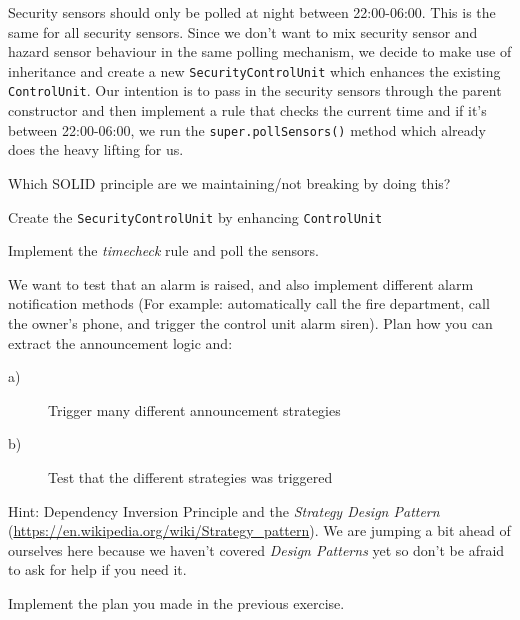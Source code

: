 \documentclass[12pt,a4paper,times]{exam}
\begin{document}
\begin{questions}
\question
Security sensors should only be polled at night between 22:00-06:00. 
This is the same for all security sensors. Since we don't want to mix 
security sensor and hazard sensor behaviour in the same polling mechanism, 
we decide to make use of inheritance and create a new \verb!SecurityControlUnit! 
which enhances the existing \verb!ControlUnit!. Our intention is to pass in the security 
sensors through the parent constructor and then implement a rule that checks the 
current time and if it's between 22:00-06:00, we run the \verb!super.pollSensors()! 
method which already does the heavy lifting for us.

\question
Which SOLID principle are we maintaining/not breaking by doing this?

\question
Create the \verb!SecurityControlUnit! by enhancing \verb!ControlUnit!

\question
Implement the \emph{timecheck} rule and poll the sensors.

\question
We want to test that an alarm is raised, and also implement different alarm notification 
methods (For example: automatically call the fire department, call the owner's phone, 
and trigger the control unit alarm siren). 
Plan how you can extract the announcement logic and: 
\begin{description}
\item[a)] Trigger many different announcement strategies 
\item[b)] Test that the different strategies was triggered 
\end{description}
Hint: Dependency Inversion Principle and the \emph{Strategy Design Pattern}
(\url{https://en.wikipedia.org/wiki/Strategy_pattern}). 
We are jumping a bit ahead of ourselves here because we haven't covered \emph{Design Patterns}
yet so don't be afraid to ask for help if you need it.

\question
Implement the plan you made in the previous exercise. 
	
\end{questions}
\end{document}
